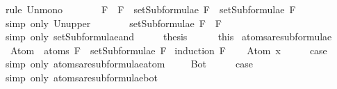 \begin{isabellebody}
\ {\isacharparenleft}rule\ Un{\isacharunderscore}mono{\isacharparenright}\isanewline
\ \ \isamarkupfalse%
\ \isamarkupfalse%
\ {\isachardoublequoteopen}{\isasymdots}\ {\isasymsubseteq}\ {\isacharbraceleft}F{}\ \isactrlbold {\isasymand}\ F{}{\isacharbraceright}\ {\isasymunion}\ {\isacharparenleft}setSubformulae\ F{}\ {\isasymunion}\ setSubformulae\ F{}{\isacharparenright}{\isachardoublequoteclose}\isanewline
\ \ \ \ \isamarkupfalse%
\ {\isacharparenleft}simp\ only{\isacharcolon}\ Un{\isacharunderscore}upper{}{\isacharparenright}\isanewline
\ \ \isamarkupfalse%
\ \isamarkupfalse%
\ {\isachardoublequoteopen}{\isasymdots}\ {\isacharequal}\ setSubformulae\ {\isacharparenleft}F{}\ \isactrlbold {\isasymand}\ F{}{\isacharparenright}{\isachardoublequoteclose}\isanewline
\ \ \ \ \isamarkupfalse%
\ {\isacharparenleft}simp\ only{\isacharcolon}\ setSubformulae{\isacharunderscore}and{\isacharparenright}\isanewline
\ \ \isamarkupfalse%
\ \isamarkupfalse%
\ {\isacharquery}thesis\isanewline
\ \ \ \ \isamarkupfalse%
\ this\isanewline
{}\isamarkupfalse%
%
\endisatagproof
{\isafoldproof}%
%
\isadelimproof
\isanewline
%
\endisadelimproof
\isanewline
{}\isamarkupfalse%
\ atoms{\isacharunderscore}are{\isacharunderscore}subformulae{\isacharcolon}\ \isanewline
\ \ {\isachardoublequoteopen}Atom\ {\isacharbackquote}\ atoms\ F\ {\isasymsubseteq}\ setSubformulae\ F{\isachardoublequoteclose}\isanewline
%
\isadelimproof
%
\endisadelimproof
%
\isatagproof
{}\isamarkupfalse%
\ {\isacharparenleft}induction\ F{\isacharparenright}\isanewline
\ \ \isamarkupfalse%
\ {\isacharparenleft}Atom\ x{\isacharparenright}\isanewline
\ \ \isamarkupfalse%
\ \isamarkupfalse%
\ {\isacharquery}case\ \isamarkupfalse%
\ {\isacharparenleft}simp\ only{\isacharcolon}\ atoms{\isacharunderscore}are{\isacharunderscore}subformulae{\isacharunderscore}atom{\isacharparenright}\ \isanewline
{}\isamarkupfalse%
\isanewline
\ \ \isamarkupfalse%
\ Bot\isanewline
\ \ \isamarkupfalse%
\ \isamarkupfalse%
\ {\isacharquery}case\ \isamarkupfalse%
\ {\isacharparenleft}simp\ only{\isacharcolon}\ atoms{\isacharunderscore}are{\isacharunderscore}subformulae{\isacharunderscore}bot{\isacharparenright}\ \isanewline
{}\isamarkupfalse%

\end{isabellebody}
